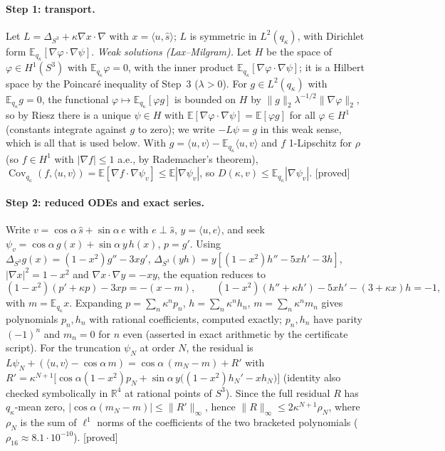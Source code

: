 \documentclass[11pt,a4paper]{article}
\theoremstyle{remark}
\theoremstyle{definition}
\newcommand{\R}{\mathbb{R}}
\newcommand{\E}{\mathbb{E}}
\newcommand{\Cov}{\operatorname{Cov}}
\newcommand{\st}[1]{\textsf{[#1]}}
\begin{document}
\paragraph{Step 1: transport.} Let $L=\Delta_{S^3}+\kappa\nabla x\cdot\nabla$ with $x=\langle u,\hat s\rangle$;
$L$ is symmetric in $L^2(q_\kappa)$, with Dirichlet form $\E_{q_\kappa}[\nabla\varphi\cdot\nabla\psi]$.
\emph{Weak solutions (Lax--Milgram).} Let $H$ be the space of $\varphi\in H^1(S^3)$ with $\E_{q_\kappa}\varphi=0$,
with the inner product $\E_{q_\kappa}[\nabla\varphi\cdot\nabla\psi]$; it is a Hilbert space by the Poincar\'e
inequality of Step~3 ($\lambda>0$). For $g\in L^2(q_\kappa)$ with $\E_{q_\kappa}g=0$, the functional
$\varphi\mapsto\E_{q_\kappa}[\varphi g]$ is bounded on $H$ by $\|g\|_2\lambda^{-1/2}\|\nabla\varphi\|_2$, so by
Riesz there is a unique $\psi\in H$ with $\E[\nabla\varphi\cdot\nabla\psi]=\E[\varphi g]$ for all
$\varphi\in H^1$ (constants integrate against $g$ to zero); we write $-L\psi=g$ in this weak sense, which is
all that is used below. With $g=\langle u,v\rangle-\E_{q_\kappa}\langle u,v\rangle$ and $f$ 1-Lipschitz for
$\rho$ (so $f\in H^1$ with $|\nabla f|\le1$ a.e., by Rademacher's theorem),
$\Cov_{q_\kappa}(f,\langle u,v\rangle)=\E[\nabla f\cdot\nabla\psi_v]\le\E|\nabla\psi_v|$, so
$D(\kappa,v)\le\E_{q_\kappa}|\nabla\psi_v|$. \st{proved}

\paragraph{Step 2: reduced ODEs and exact series.} Write $v=\cos\alpha\,\hat s+\sin\alpha\,e$ with
$e\perp\hat s$, $y=\langle u,e\rangle$, and seek $\psi_v=\cos\alpha\,g(x)+\sin\alpha\,y\,h(x)$, $p=g'$.
Using $\Delta_{S^3}g(x)=(1-x^2)g''-3xg'$, $\Delta_{S^3}(yh)=y[(1-x^2)h''-5xh'-3h]$,
$|\nabla x|^2=1-x^2$ and $\nabla x\cdot\nabla y=-xy$, the equation reduces to
\[
(1-x^2)(p'+\kappa p)-3xp=-(x-m),\qquad (1-x^2)(h''+\kappa h')-5xh'-(3+\kappa x)h=-1,
\]
with $m=\E_{q_\kappa}x$. Expanding $p=\sum_n\kappa^np_n$, $h=\sum_n\kappa^nh_n$, $m=\sum_n\kappa^nm_n$ gives
polynomials $p_n,h_n$ with rational coefficients, computed exactly; $p_n,h_n$ have parity $(-1)^n$ and
$m_n=0$ for $n$ even (asserted in exact arithmetic by the certificate script).
For the truncation $\psi_N$ at order $N$, the residual is
$L\psi_N+(\langle u,v\rangle-\cos\alpha\,m)=\cos\alpha\,(m_N-m)+R'$ with
$R'=\kappa^{N+1}\big[\cos\alpha(1-x^2)p_N+\sin\alpha\,y\big((1-x^2)h_N'-xh_N\big)\big]$
(identity also checked symbolically in $\R^4$ at rational points of $S^3$).
Since the full residual $R$ has $q_\kappa$-mean zero, $|\cos\alpha(m_N-m)|\le\|R'\|_\infty$, hence
$\|R\|_\infty\le2\kappa^{N+1}\rho_N$, where $\rho_N$ is the sum of $\ell^1$ norms of the coefficients of the
two bracketed polynomials ($\rho_{16}\approx8.1\cdot10^{-10}$). \st{proved}
\end{document}
